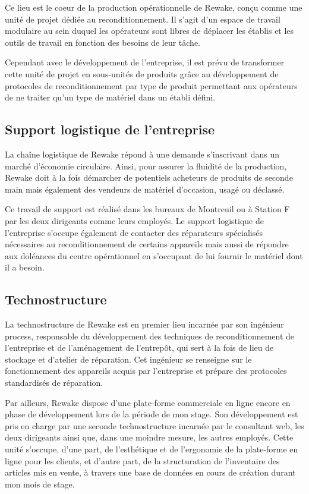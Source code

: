 \documentclass{rapportENSCP}
\begin{document}
Ce lieu est le coeur de la production opérationnelle de Rewake, conçu comme une unité de projet dédiée au reconditionnement. Il s'agit d'un espace de travail modulaire au sein duquel les opérateurs sont libres de déplacer les établis et les outils de travail en fonction des besoins de leur tâche.

Cependant avec le développement de l'entreprise, il est prévu de transformer cette unité de projet en sous-unités de produits grâce au développement de protocoles de reconditionnement par type de produit permettant aux opérateurs de ne traiter qu'un type de matériel dans un établi défini.

\subsection{Support logistique de l'entreprise}
La chaîne logistique de Rewake répond à une demande s'inscrivant dans un marché d'économie circulaire. Ainsi, pour assurer la fluidité de la production, Rewake doit à la fois démarcher de potentiels acheteurs de produits de seconde main mais également des vendeurs de matériel d'occasion, usagé ou déclassé. 

Ce travail de support est réalisé dans les bureaux de Montreuil ou à Station F par les deux dirigeants comme leurs employés. Le support logistique de l'entreprise s'occupe également de contacter des réparateurs spécialisés nécessaires au reconditionnement de certains appareils mais aussi de répondre aux doléances du centre opérationnel en s'occupant de lui fournir le matériel dont il a besoin. 

\subsection{Technostructure}
La technostructure de Rewake est en premier lieu incarnée par son ingénieur process, responsable du développement des techniques de reconditionnement de l'entreprise et de l'aménagement de l'entrepôt, qui sert à la fois de lieu de stockage et d'atelier de réparation. Cet ingénieur se renseigne sur le fonctionnement des appareils acquis par l'entreprise et prépare des protocoles standardisés de réparation.

Par ailleurs, Rewake dispose d'une plate-forme commerciale en ligne encore en phase de développement lors de la période de mon stage. Son développement est pris en charge par une seconde technostructure incarnée par le consultant web, les deux dirigeants ainsi que, dans une moindre mesure, les autres employés. Cette unité s'occupe, d'une part, de l'esthétique et de l'ergonomie de la plate-forme en ligne pour les clients, et d'autre part, de la structuration de l'inventaire des articles mis en vente, à travers une base de données en cours de création durant mon mois de stage.
\end{document}

